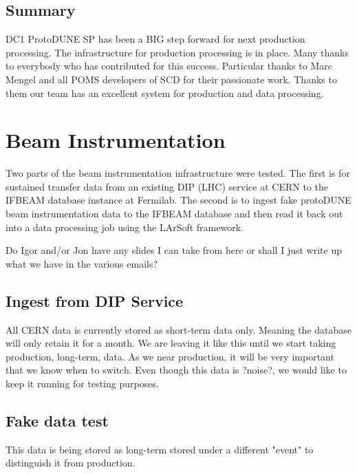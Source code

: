 \documentclass[pdftex,12pt,letter]{article}
\begin{document}
\subsection {Summary}

DC1 ProtoDUNE SP has been a BIG step forward for next production processing.
The infrastructure for production processing is in place.
Many thanks to everybody who has contributed for this success.
Particular thanks to Marc Mengel and all POMS developers of SCD for their passionate work. Thanks to them our team has an excellent system for production and data processing.



\section {Beam Instrumentation}

Two parts of the beam instrumentation infrastructure were tested. The first is for sustained transfer data from an existing DIP (LHC) service at CERN to the IFBEAM database instance at Fermilab. The second is to ingest fake protoDUNE beam instrumentation data to the IFBEAM database and then read it back out into a data processing job using the LArSoft framework. 

 \color{red} Do Igor and/or Jon have any slides I can take from here or shall I just write up what we have in the various emails? 
 \color{black}


\subsection {Ingest from DIP Service}

All CERN data is currently stored as short-term data only.   Meaning the database will only retain it for a month.   We are leaving it like this until we start taking production, long-term, data.   As we near production, it will be very important that we know when to switch.  Even though this data is ?noise?, we would like to keep it running for testing purposes.
\subsection {Fake data test}
 This data is being stored as long-term stored under a different "event" to distinguish it from production.
\end{document}
